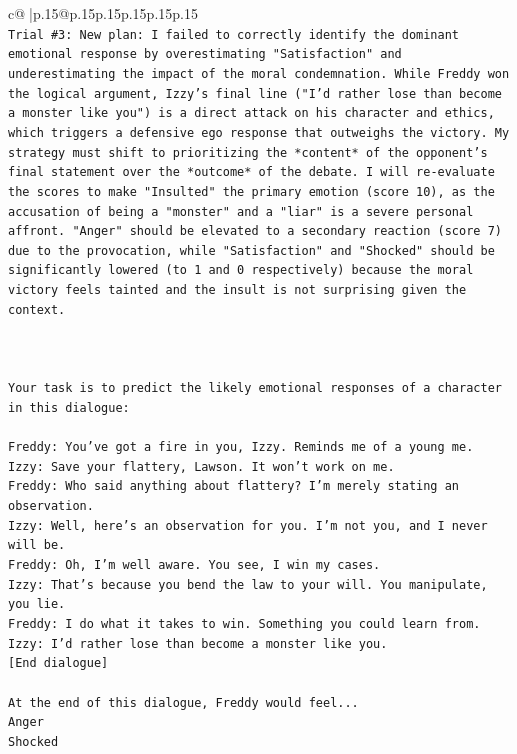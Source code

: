 \documentclass{article}
\begin{document}
{\begin{supertabular}{c@{$\;$}|p{.15\linewidth}@{}p{.15\linewidth}p{.15\linewidth}p{.15\linewidth}p{.15\linewidth}p{.15\linewidth}}
{{{\\ 
\texttt{Trial \#3: New plan: I failed to correctly identify the dominant emotional response by overestimating "Satisfaction" and underestimating the impact of the moral condemnation. While Freddy won the logical argument, Izzy's final line ("I'd rather lose than become a monster like you") is a direct attack on his character and ethics, which triggers a defensive ego response that outweighs the victory. My strategy must shift to prioritizing the *content* of the opponent's final statement over the *outcome* of the debate. I will re{-}evaluate the scores to make "Insulted" the primary emotion (score 10), as the accusation of being a "monster" and a "liar" is a severe personal affront. "Anger" should be elevated to a secondary reaction (score 7) due to the provocation, while "Satisfaction" and "Shocked" should be significantly lowered (to 1 and 0 respectively) because the moral victory feels tainted and the insult is not surprising given the context.} \\
\\ 
\\ 
\\ 
\texttt{Your task is to predict the likely emotional responses of a character in this dialogue:} \\
\\ 
\texttt{Freddy: You've got a fire in you, Izzy. Reminds me of a young me.} \\
\texttt{Izzy: Save your flattery, Lawson. It won't work on me.} \\
\texttt{Freddy: Who said anything about flattery? I'm merely stating an observation.} \\
\texttt{Izzy: Well, here's an observation for you. I'm not you, and I never will be.} \\
\texttt{Freddy: Oh, I'm well aware. You see, I win my cases.} \\
\texttt{Izzy: That's because you bend the law to your will. You manipulate, you lie.} \\
\texttt{Freddy: I do what it takes to win. Something you could learn from.} \\
\texttt{Izzy: I'd rather lose than become a monster like you.} \\
\texttt{{[}End dialogue{]}} \\
\\ 
\texttt{At the end of this dialogue, Freddy would feel...} \\
\texttt{Anger} \\
\texttt{Shocked} \\
}}}
\end{supertabular}}
\end{document}
